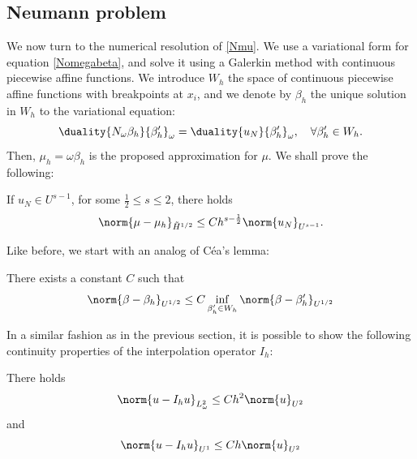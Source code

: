 \documentclass[a4paper]{article}
\begin{document}
	\subsection{Neumann problem}
	
	We now turn to the numerical resolution of \eqref{Nmu}. We use a variational form for equation \eqref{Nomegabeta}, and solve it using a Galerkin method with continuous piecewise affine functions. We introduce $W_h$ the space of continuous piecewise affine functions with breakpoints at $x_i$, and we denote by $\beta_h$ the unique solution in $W_h$ to the variational equation:
	\begin{equation}
	\duality{N_\omega \beta_h}{\beta_h'}_{\omega} = \duality{u_N}{\beta_h'}_{\omega}, \quad \forall \beta_h' \in W_h.
	\label{NomegaBetaGalerk}
	\end{equation}
	Then, $\mu_h = \omega \beta_h$ is the proposed approximation for $\mu$. 
	We shall prove the following:
	\begin{The}
		If $u_N \in U^{s-1}$, for some $\frac{1}{2} \leq s \leq 2$, there holds 
		\[\norm{\mu - \mu_h}_{\tilde{H}^{1/2}} \leq C h^{s - \frac{1}{2}}\norm{u_N}_{U^{s-1}}.\]
		\label{theOrdreCVNeumann}
	\end{The}
	\noindent Like before, we start with an analog of Céa's lemma:
	\begin{Lem}
		There exists a constant $C$ such that
		\[\norm{\beta - \beta_h}_{U^{1/2}} \leq C \inf_{\beta'_h \in W_h} \norm{\beta - \beta'_h}_{U^{1/2}}\] 
		\label{CeaNeumann}
	\end{Lem}
	\noindent In a similar fashion as in the previous section, it is possible to show the following continuity properties of the interpolation operator $I_h$: 
	\begin{Lem} 
		\label{U0U2,U1U2}
		There holds 
		\[ \norm{ u - I_h u}_{L^2_\omega} \leq Ch^2\norm{u}_{U^2}\]
		and
		\[\norm{u-I_h u}_{U^1} \leq Ch \norm{u}_{U^2}\]	
	\end{Lem}
\end{document}
